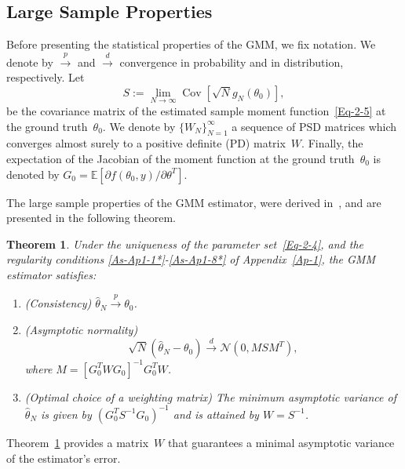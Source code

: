 \documentclass{article}
\newtheorem{theorem}[assumption]{Theorem}%
\newcommand{\E}[0]{\mathbb{E}}
\newcommand{\Cov}[0]{\operatorname{Cov}}
\begin{document}
\subsection{Large Sample Properties}\label{gmm:large}

Before presenting the statistical properties of the GMM, we fix notation. We denote by $\overset{p}{\to}$ and $\overset{d}{\to}$ convergence in  probability and in distribution, respectively. Let
\begin{equation} \label{eqn:cov_mat_S}
	S := \lim_{N\to \infty}\Cov\left[\sqrt{N}g_N(\theta_0)\right],
\end{equation}
be the covariance matrix of the estimated sample moment function~\eqref{Eq-2-5} at the ground truth~$\theta_0$. We denote by $\{W_N\}_{N=1}^\infty$ a sequence of PSD matrices which converges almost surely to a positive definite (PD) matrix~$W$. Finally, the expectation of the Jacobian of the moment function at the ground truth~$\theta_0$ is denoted by $G_0 = \E\left[\partial f(\theta_0, y) / \partial \theta^T\right]$.


The large sample properties of the GMM estimator, were derived in~\cite{Hansen1982}, and are presented in the following theorem.

\begin{theorem}\label{Thm-2-6}
	Under the uniqueness of the parameter set~\eqref{Eq-2-4}, and {the} regularity conditions {\ref{As-Ap1-1*}-\ref{As-Ap1-8*} of Appendix~\ref{Ap-1}}, the GMM estimator satisfies:
	\begin{enumerate}[label={\Alph*}.]
		\item  \label{Thm-2-2}
		\textnormal{(Consistency)} $\hat{\theta}_N \overset{p}{\to} \theta_0$.

		\item \label{Thm-2-3} \textnormal{(Asymptotic normality)}
		\[\sqrt{N} ( \hat{\theta}_N - \theta_0) \overset{d}{\to} \mathcal{N}(0, M S M^T ),\] where $M =[G_0^T W  G_0]^{-1} G_0^T  W$.

		\item \label{Thm-2-5} \textnormal{(Optimal choice of a weighting matrix)} The minimum asymptotic variance of $\hat{\theta}_N$ is given by $(G_0^T S^{-1} G_0)^{-1}$ and is attained by $W = S^{-1}$.
	\end{enumerate}
\end{theorem}
Theorem~\ref{Thm-2-6} provides a matrix~$W$ {that} guarantees a minimal asymptotic variance of the estimator’s error.
\end{document}
